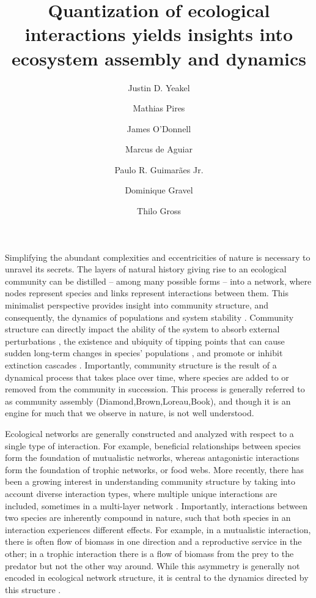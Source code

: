 \documentclass[9pt,twocolumn,twoside]{pnas-new}
\title{Quantization of ecological interactions yields insights into ecosystem assembly and dynamics}
\author[a,b]{Justin D. Yeakel}
\author[c]{Mathias Pires}
\author[d]{James O'Donnell}
\author[c]{Marcus de Aguiar}
\author[e]{Paulo R. Guimar\~aes Jr.}
\author[f]{Dominique Gravel}
\author[g]{Thilo Gross}
\affil[a]{School of Natural Sciences, University of California Merced, Merced, CA 95343, USA}
\affil[b]{Santa Fe Institute}
\affil[c]{Universidade Estadual de Campinas}
\affil[d]{University of Washington}
\affil[e]{Universidade de S\~ao Paulo}
\affil[f]{Universit\`e de Sherbrooke}
\affil[g]{University of California Davis, Davis CA}
\begin{document}
\verticaladjustment{-2pt}

\maketitle
\thispagestyle{firststyle}


Simplifying the abundant complexities and eccentricities of nature is necessary to unravel its secrets.
The layers of natural history giving rise to an ecological community can be distilled -- among many possible forms -- into a network, where nodes represent species and links represent interactions between them.
This minimalist perspective provides insight into community structure, and consequently, the dynamics of populations and system stability \cite{May1972}.
Community structure can directly impact the ability of the system to absorb external perturbations \cite{Yeakel2014,Novak2016}, the existence and ubiquity of tipping points that can cause sudden long-term changes in species' populations \cite{Lade2011,Boettiger2012}, and promote or inhibit extinction cascades \cite{Stouffer2011}.
Importantly, community structure is the result of a dynamical process that takes place over time, where species are added to or removed from the community in succession.
This process is generally referred to as community assembly (Diamond,Brown,Loreau,Book), and though it is an engine for much that we observe in nature, is not well understood.

Ecological networks are generally constructed and analyzed with respect to a single type of interaction.
For example, beneficial relationships between species form the foundation of mutualistic networks, whereas antagonistic interactions form the foundation of trophic networks, or food webs. %
More recently, there has been a growing interest in understanding community structure by taking into account diverse interaction types, where multiple unique interactions are included, sometimes in a multi-layer network \cite{Kefi2016,Pilosof2017}.
Importantly, interactions between two species are inherently compound in nature, such that both species in an interaction experiences different effects.
For example, in a mutualistic interaction, there is often flow of biomass in one direction and a reproductive service in the other; in a trophic interaction there is a flow of biomass from the prey to the predator but not the other way around.
While this asymmetry is generally not encoded in ecological network structure, it is central to the dynamics directed by this structure \cite{Gross2009,Allesina2012}.
\end{document}
